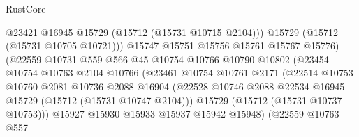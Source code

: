 \begin{lexlean}{RustCore}
\begin{coremodule}
                                        @23421
                                        @16945
                                        @15729
                                        (@15712 (@15731 @10715 @2104)))
                                      @15729
                                      (@15712 (@15731 @10705 @10721)))
                                    @15747
                                    @15751
                                    @15756
                                    @15761
                                    @15767
                                    @15776)
                                  (@22559
                                    @10731
                                    @559
                                    @566
                                    @45
                                    @10754
                                    @10766
                                    @10790
                                    @10802
                                    (@23454
                                      @10754
                                      @10763
                                      @2104
                                      @10766
                                      (@23461
                                        @10754
                                        @10761
                                        @2171
                                        (@22514
                                          @10753
                                          @10760
                                          @2081
                                          @10736
                                          @2088
                                          @16904
                                          (@22528
                                            @10746
                                            @2088
                                            @22534
                                            @16945
                                            @15729
                                            (@15712 (@15731 @10747 @2104)))
                                          @15729
                                          (@15712 (@15731 @10737 @10753)))
                                        @15927
                                        @15930
                                        @15933
                                        @15937
                                        @15942
                                        @15948)
                                      (@22559
                                        @10763
                                        @557

\end{coremodule}
\end{lexlean}
